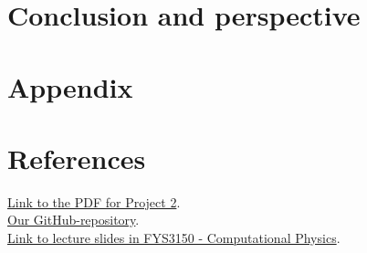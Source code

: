 \documentclass{article}
\begin{document}
\begin{multicols}{2}
\vspace{1cm}

\section{Conclusion and perspective} \label{sec:Conclusion}



\vspace{1cm}

\section{Appendix} \label{sec:Appendix}





\vspace{1cm}

\section{References} \label{sec:References}


\href{https://github.com/CompPhysics/ComputationalPhysics/blob/master/doc/Projects/2019/Project2/pdf/Project2.pdf}{Link to the PDF for Project 2}. \\

\href{https://github.com/Erikbgram/Fys3150}{Our GitHub-repository}. \\

\href{https://github.com/CompPhysics/ComputationalPhysics/blob/master/doc/Lectures/lectures2015.pdf}{Link to lecture slides in FYS3150 - Computational Physics}.









\end{multicols}
\end{document}
